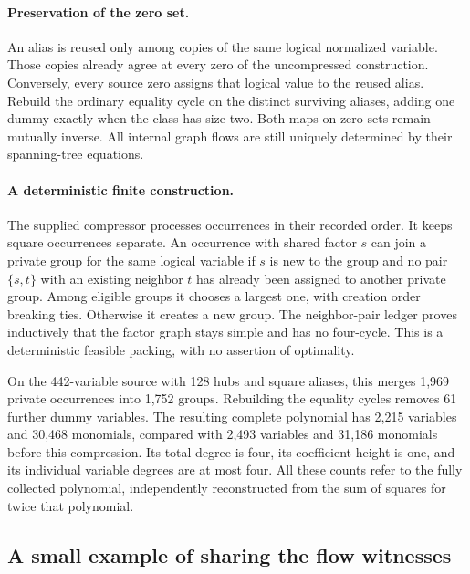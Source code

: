 \paragraph{Preservation of the zero set.}
An alias is reused only among copies of the same logical normalized
variable. Those copies already agree at every zero of the uncompressed
construction. Conversely, every source zero assigns that logical value
to the reused alias. Rebuild the ordinary equality cycle on the distinct
surviving aliases, adding one dummy exactly when the class has size two.
Both maps on zero sets remain mutually inverse. All internal graph flows
are still uniquely determined by their spanning-tree equations.

\paragraph{A deterministic finite construction.}
The supplied compressor processes occurrences in their recorded order.
It keeps square occurrences separate. An occurrence with shared factor
$s$ can join a private group for the same logical variable if $s$ is new
to the group and no pair $\{s,t\}$ with an existing neighbor $t$ has
already been assigned to another private group. Among eligible groups
it chooses a largest one, with creation order breaking ties. Otherwise
it creates a new group. The neighbor-pair ledger proves inductively that
the factor graph stays simple and has no four-cycle. This is a
deterministic feasible packing, with no assertion of optimality.

On the 442-variable source with 128 hubs and square aliases, this merges
1,969 private occurrences into 1,752 groups. Rebuilding the equality
cycles removes 61 further dummy variables. The resulting complete
polynomial has 2,215 variables and 30,468 monomials, compared with
2,493 variables and 31,186 monomials before this compression. Its total
degree is four, its coefficient height is one, and its individual
variable degrees are at most four. All these counts refer to the fully
collected polynomial, independently reconstructed from the sum of
squares for twice that polynomial.

\subsection{A small example of sharing the flow witnesses}
\label{sec:two-row-example}

